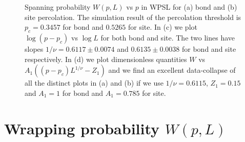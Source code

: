 \documentclass[twocolumn,showpacs,preprintnumbers,amsmath,amssymb]{article}
\begin{document}
\begin{figure}
\centering
%


\caption{Spanning probability $W(p,L)$ vs $p$ in WPSL for (a) bond and 
(b) site percolation. The simulation result of the percolation threshold is
$p_{c}=0.3457$ for bond and $0.5265$ for site. In (c) we plot $\log(p-p_c)$ vs $\log L$ for both bond and site. The two lines have slopes $1/\nu=0.6117\pm 0.0074$ and $0.6135 \pm 0.0038$ for bond and site respectively. In (d) we plot dimensionless quantities $W$ vs $A_1((p-p_c)L^{1/\nu}-Z_1)$ and we find an excellent data-collapse of all the distinct plots in (a) and (b) if we use $1/\nu=0.6115$, $Z_1= 0.15$ and $A_1=1$ for bond and $A_1=0.785$ for site.
} 
\label{fig:2abcd}
\end{figure}

\section{Wrapping probability $W(p,L)$}
\end{document}
